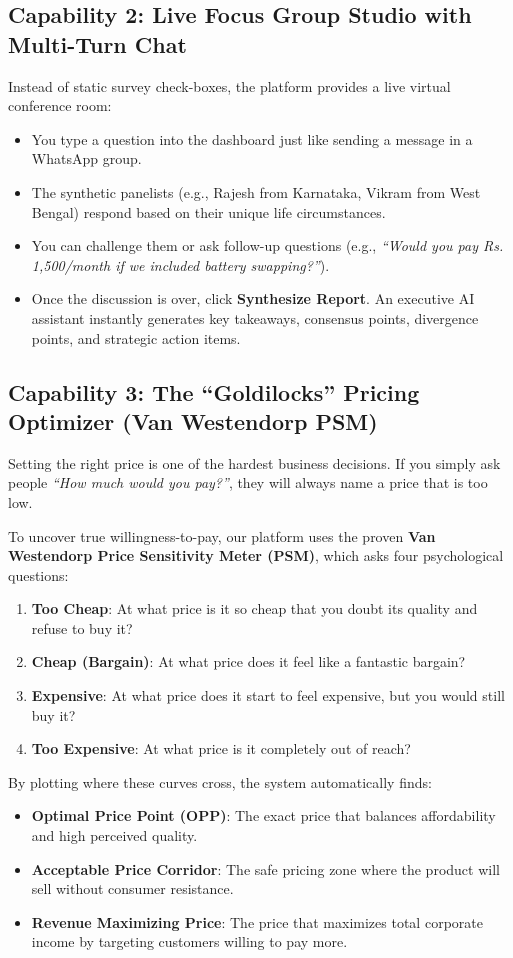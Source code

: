 \documentclass[11pt,a4paper]{article}
\begin{document}
\subsection{Capability 2: Live Focus Group Studio with Multi-Turn Chat}
Instead of static survey check-boxes, the platform provides a live virtual conference room:
\begin{itemize}[noitemsep]
  \item You type a question into the dashboard just like sending a message in a WhatsApp group.
  \item The synthetic panelists (e.g., Rajesh from Karnataka, Vikram from West Bengal) respond based on their unique life circumstances.
  \item You can challenge them or ask follow-up questions (e.g., \textit{``Would you pay Rs. 1,500/month if we included battery swapping?''}).
  \item Once the discussion is over, click \textbf{Synthesize Report}. An executive AI assistant instantly generates key takeaways, consensus points, divergence points, and strategic action items.
\end{itemize}

\subsection{Capability 3: The ``Goldilocks'' Pricing Optimizer (Van Westendorp PSM)}
Setting the right price is one of the hardest business decisions. If you simply ask people \textit{``How much would you pay?''}, they will always name a price that is too low.

To uncover true willingness-to-pay, our platform uses the proven \textbf{Van Westendorp Price Sensitivity Meter (PSM)}, which asks four psychological questions:
\begin{enumerate}[noitemsep]
  \item \textbf{Too Cheap}: At what price is it so cheap that you doubt its quality and refuse to buy it?
  \item \textbf{Cheap (Bargain)}: At what price does it feel like a fantastic bargain?
  \item \textbf{Expensive}: At what price does it start to feel expensive, but you would still buy it?
  \item \textbf{Too Expensive}: At what price is it completely out of reach?
\end{enumerate}

By plotting where these curves cross, the system automatically finds:
\begin{itemize}[noitemsep]
  \item \textbf{Optimal Price Point (OPP)}: The exact price that balances affordability and high perceived quality.
  \item \textbf{Acceptable Price Corridor}: The safe pricing zone where the product will sell without consumer resistance.
  \item \textbf{Revenue Maximizing Price}: The price that maximizes total corporate income by targeting customers willing to pay more.
\end{itemize}
\end{document}
